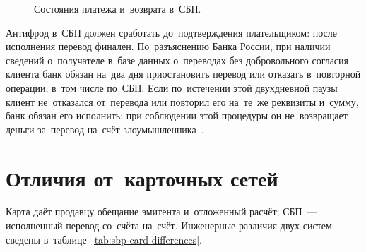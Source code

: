 \begin{figure}[H]
  \centering
  \caption{Состояния платежа и~возврата
  в~СБП.}\label{fig:sbp-payment-refund-states}
\end{figure}

Антифрод в~СБП должен сработать до~подтверждения плательщиком: после исполнения
перевод финален. По~разъяснению Банка
России, при наличии сведений о~получателе в~базе данных о~переводах без
добровольного согласия клиента банк обязан на~два дня приостановить перевод или
отказать в~повторной операции, в~том числе по~СБП. Если по~истечении этой
двухдневной паузы клиент не~отказался от~перевода или повторил его на~те~же
реквизиты и~сумму, банк обязан его исполнить; при соблюдении этой процедуры он не~возвращает деньги за~перевод
на~счёт злоумышленника~\cite{fz-369-2023,cbr-sbp-faq-cooling-period}.

\section{Отличия от~карточных сетей}\label{sec:sbp-vs-cards}

Карта даёт продавцу обещание эмитента и~отложенный расчёт; СБП~--- исполненный
перевод со~счёта на~счёт. Инженерные различия двух систем сведены
в~таблице~\ref{tab:sbp-card-differences}.

